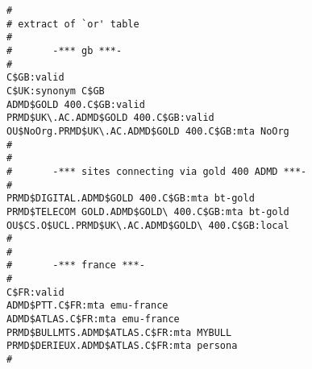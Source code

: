 \small
\begin{verbatim}
#
# extract of `or' table
#
#       -*** gb ***-
#
C$GB:valid
C$UK:synonym C$GB
ADMD$GOLD 400.C$GB:valid
PRMD$UK\.AC.ADMD$GOLD 400.C$GB:valid
OU$NoOrg.PRMD$UK\.AC.ADMD$GOLD 400.C$GB:mta NoOrg
#
#
#       -*** sites connecting via gold 400 ADMD ***-
#
PRMD$DIGITAL.ADMD$GOLD 400.C$GB:mta bt-gold
PRMD$TELECOM GOLD.ADMD$GOLD\ 400.C$GB:mta bt-gold
OU$CS.O$UCL.PRMD$UK\.AC.ADMD$GOLD\ 400.C$GB:local
#
#
#       -*** france ***-
#
C$FR:valid
ADMD$PTT.C$FR:mta emu-france
ADMD$ATLAS.C$FR:mta emu-france
PRMD$BULLMTS.ADMD$ATLAS.C$FR:mta MYBULL
PRMD$DERIEUX.ADMD$ATLAS.C$FR:mta persona
#
\end{verbatim}
